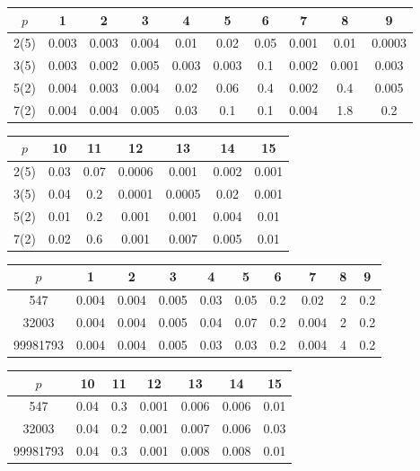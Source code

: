 \documentclass{slides}
\def\fbc{\bf\color{MediumBlue}}
\begin{document}
\begin{slide}{}
\begin{center}
\fbox{\fbc \large Timing data (Asir)}
\end{center}

\begin{center}
{\small
\begin{tabular}{c|ccccccccc} \hline
$p$ & 1 & 2 & 3 & 4 & 5 & 6 & 7 & 8 & 9 \\ \hline
2(5) & 0.003 & 0.003 & 0.004 & 0.01 & 0.02 & 0.05 & 0.001 & 0.01 & 0.0003 \\ \hline
3(5) & 0.003 & 0.002 & 0.005 & 0.003 & 0.003 & 0.1 & 0.002 & 0.001 & 0.003  \\ \hline
5(2) & 0.004 & 0.003 & 0.004 & 0.02 & 0.06 & 0.4 & 0.002 & 0.4 & 0.005 \\ \hline
7(2) & 0.004  & 0.004  & 0.005 & 0.03 & 0.1  & 0.1  & 0.004  & 1.8  & 0.2 \\ \hline
\end{tabular}

\begin{tabular}{c|cccccc} \hline
$p$ & 10 & 11 & 12 & 13 & 14 &  15 \\ \hline
2(5) & 0.03 & 0.07 & 0.0006 & 0.001 & 0.002 & 0.001  \\ \hline
3(5) & 0.04 & 0.2 & 0.0001  & 0.0005 & 0.02  & 0.001 \\ \hline
5(2) & 0.01  & 0.2  & 0.001 & 0.001 & 0.004  & 0.01  \\ \hline
7(2) & 0.02  & 0.6  & 0.001  & 0.007  & 0.005 & 0.01 \\ \hline
\end{tabular}

\begin{tabular}{c|ccccccccc} \hline
$p$ & 1 & 2 & 3 & 4 & 5 & 6 & 7 & 8 & 9 \\ \hline
547 & 0.004 & 0.004 & 0.005 & 0.03 & 0.05 & 0.2 & 0.02& 2& 0.2\\ \hline
32003 & 0.004  &  0.004 & 0.005  &0.04  &0.07  & 0.2 & 0.004 & 2 & 0.2 \\ \hline
99981793& 0.004 & 0.004& 0.005 & 0.03 & 0.03 & 0.2 & 0.004 & 4 & 0.2  \\ \hline
\end{tabular}

\begin{tabular}{c|cccccc} \hline
$p$ & 10 & 11 & 12 & 13 & 14 &  15 \\ \hline
547 & 0.04 & 0.3 & 0.001 &0.006  & 0.006 & 0.01  \\ \hline
32003 & 0.04 &0.2  &0.001  &0.007  & 0.006  & 0.03 \\ \hline
99981793 & 0.04  & 0.3  &0.001  & 0.008 & 0.008  & 0.01  \\ \hline
\end{tabular}
}
\end{center}
\end{slide}
\end{document}

